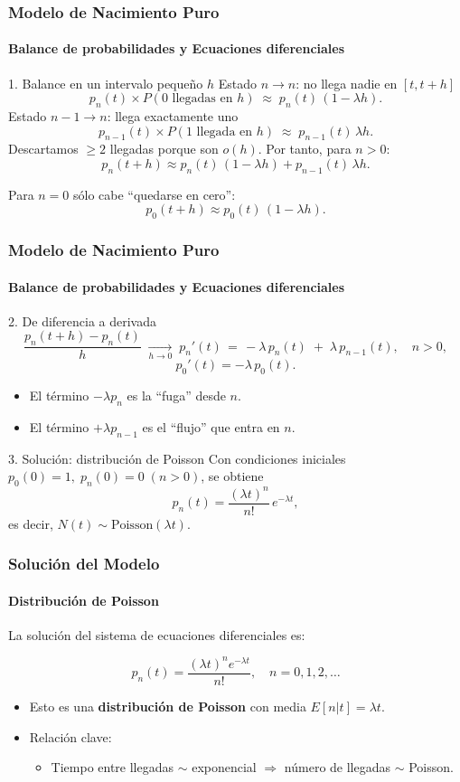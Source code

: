 \documentclass{beamer}
\begin{document}
\begin{frame}
\frametitle{Modelo de Nacimiento Puro}
\framesubtitle{Balance de probabilidades y Ecuaciones diferenciales}

\begin{block}{1. Balance en un intervalo pequeño \(h\)}
Estado \(n\to n\): no llega nadie en \([t,t+h]\)
    \[
      p_n(t)\times P(0\text{ llegadas en }h)
      \;\approx\;p_n(t)\,(1-\lambda h).
    \]
Estado \(n-1\to n\): llega exactamente uno
    \[
      p_{n-1}(t)\times P(1\text{ llegada en }h)
      \;\approx\;p_{n-1}(t)\,\lambda h.
    \]
Descartamos \(\ge2\) llegadas porque son \(o(h)\). Por tanto, para \(n>0\):
    \[
      p_n(t+h)\approx p_n(t)\,(1-\lambda h)
      +p_{n-1}(t)\,\lambda h.
    \]
  \item Para \(n=0\) sólo cabe “quedarse en cero”:
    \[
      p_0(t+h)\approx p_0(t)\,(1-\lambda h).
    \]
\end{block}
\end{frame}

\begin{frame}
\frametitle{Modelo de Nacimiento Puro}
\framesubtitle{Balance de probabilidades y Ecuaciones diferenciales}
\begin{block}{2. De diferencia a derivada}
\[
\frac{p_n(t+h)-p_n(t)}{h}
\;\xrightarrow[h\to0]{}\;
p_n'(t)
\,=\,
-\lambda\,p_n(t)
\;+\;\lambda\,p_{n-1}(t),
\quad n>0,
\]
\[
p_0'(t)=-\lambda\,p_0(t).
\]
\begin{itemize}
  \item El término \(-\lambda p_n\) es la “fuga” desde \(n\).
  \item El término \(+\lambda p_{n-1}\) es el “flujo” que entra en \(n\).
\end{itemize}
\end{block}

\begin{block}{3. Solución: distribución de Poisson}
Con condiciones iniciales
\(
  p_0(0)=1,\;p_n(0)=0\;(n>0)
\),
se obtiene
\[
  p_n(t)
  = \frac{(\lambda t)^n}{n!}\,e^{-\lambda t},
\]
es decir, \(N(t)\sim\mathrm{Poisson}(\lambda t)\).
\end{block}
\end{frame}

\begin{frame}
\frametitle{Solución del Modelo}
\framesubtitle{Distribución de Poisson}

La solución del sistema de ecuaciones diferenciales es:

\[
p_n(t) = \frac{(\lambda t)^n e^{-\lambda t}}{n!}, \quad n = 0, 1, 2, \dots
\]

\begin{itemize}
    \item Esto es una \textbf{distribución de Poisson} con media $E[n|t] = \lambda t$.
    \item Relación clave:
    \begin{itemize}
        \item Tiempo entre llegadas $\sim$ exponencial $\Rightarrow$ número de llegadas $\sim$ Poisson.
    \end{itemize}
\end{itemize}
\end{frame}
\end{document}
